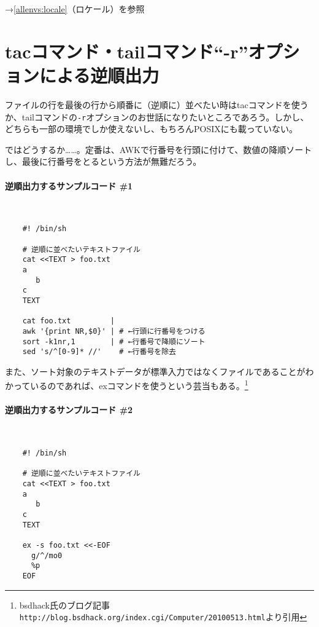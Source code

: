 \noindent
→\ref{allenvs:locale}（ロケール）を参照

\section{tacコマンド・tailコマンド``-r''オプションによる逆順出力}

ファイルの行を最後の行から順番に（逆順に）並べたい時はtacコマンドを使うか、tailコマンドの\verb|-r|オプションのお世話になりたいところであろう。しかし、どちらも一部の環境でしか使えないし、もちろんPOSIXにも載っていない。

ではどうするか……。定番は、AWKで行番号を行頭に付けて、数値の降順ソートし、最後に行番号をとるという方法が無難だろう。

\paragraph{逆順出力するサンプルコード \#1} 　\\
\begin{frameboxit}{160.0mm}
\begin{verbatim}
	#! /bin/sh

	# 逆順に並べたいテキストファイル
	cat <<TEXT > foo.txt
	a
	   b
	c
	TEXT

	cat foo.txt         |
	awk '{print NR,$0}' | # ←行頭に行番号をつける
	sort -k1nr,1        | # ←行番号で降順にソート
	sed 's/^[0-9]* //'    # ←行番号を除去
\end{verbatim}
\end{frameboxit}

また、ソート対象のテキストデータが標準入力ではなくファイルであることがわかっているのであれば、exコマンドを使うという芸当もある。\footnote{bsdhack氏のブログ記事\verb|http://blog.bsdhack.org/index.cgi/Computer/20100513.html|より引用}

\paragraph{逆順出力するサンプルコード \#2} 　\\
\begin{frameboxit}{160.0mm}
\begin{verbatim}
	#! /bin/sh

	# 逆順に並べたいテキストファイル
	cat <<TEXT > foo.txt
	a
	   b
	c
	TEXT

	ex -s foo.txt <<-EOF
	  g/^/mo0
	  %p
	EOF
\end{verbatim}
\end{frameboxit}

